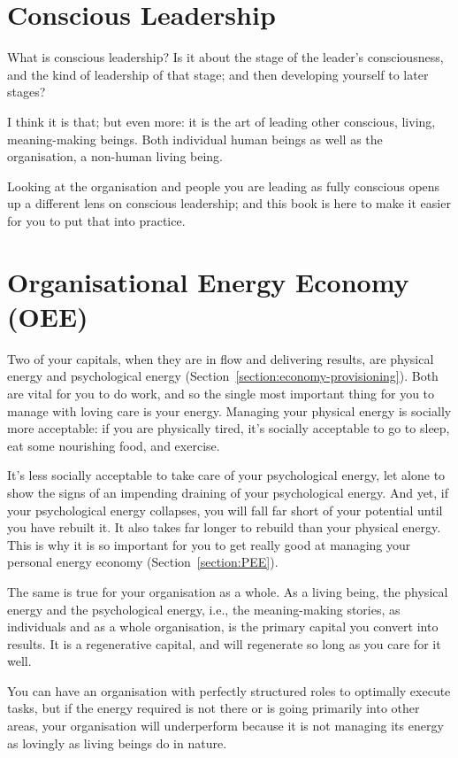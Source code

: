 \section{Conscious Leadership}
What is conscious leadership? Is it about the stage of the leader’s consciousness, and the kind of leadership of that stage; and then developing yourself to later stages?


I think it is that; but even more: it is the art of leading other conscious, living, meaning\hyp{}making beings. Both individual human beings as well as the organisation, a non-human living being. 


Looking at the organisation and people you are leading as fully conscious opens up a different lens on conscious leadership; and this book is here to make it easier for you to put that into practice.
\section{Organisational Energy Economy (OEE)}
\label{section:OEE}


Two of your capitals, when they are in flow and delivering results,  are physical energy and psychological energy (Section~\ref{section:economy-provisioning}). Both are vital for you to do work, and so the single most important thing for you to manage with loving care is your energy. Managing your physical energy is socially more acceptable: if you are physically tired, it's socially acceptable to go to sleep, eat some nourishing food, and exercise.


It's less socially acceptable to take care of your psychological energy, let alone to show the signs of an impending draining of your psychological energy. And yet, if your psychological energy collapses, you will fall far short of your potential until you have rebuilt it. It also takes far longer to rebuild than your physical energy. This is why it is so important for you to get really good at managing your personal energy economy (Section~\ref{section:PEE}). 


The same is true for your organisation as a whole. As a living being, the physical energy and the psychological energy, i.e., the meaning\hyp{}making stories, as individuals and as a whole organisation, is the primary capital you convert into results. It is a regenerative capital, and will regenerate so long as you care for it well.


You can have an organisation with perfectly structured roles to optimally execute tasks, but if the energy required is not there or is going primarily into other areas, your organisation will underperform because it is not managing its energy as lovingly as living beings do in nature.


